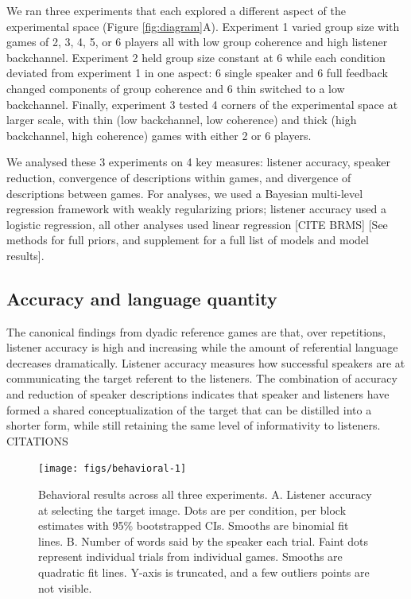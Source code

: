 \documentclass[
  english,
  a4paper,
]{article}
\begin{document}
We ran three experiments that each explored a different aspect of the experimental space (Figure \ref{fig:diagram}A). Experiment 1 varied group size with games of 2, 3, 4, 5, or 6 players all with low group coherence and high listener backchannel. Experiment 2 held group size constant at 6 while each condition deviated from experiment 1 in one aspect: 6 single speaker and 6 full feedback changed components of group coherence and 6 thin switched to a low backchannel. Finally, experiment 3 tested 4 corners of the experimental space at larger scale, with thin (low backchannel, low coherence) and thick (high backchannel, high coherence) games with either 2 or 6 players.

We analysed these 3 experiments on 4 key measures: listener accuracy, speaker reduction, convergence of descriptions within games, and divergence of descriptions between games. For analyses, we used a Bayesian multi-level regression framework with weakly regularizing priors; listener accuracy used a logistic regression, all other analyses used linear regression {[}CITE BRMS{]} {[}See methods for full priors, and supplement for a full list of models and model results{]}.

\hypertarget{accuracy-and-language-quantity}{%
\subsection{Accuracy and language quantity}\label{accuracy-and-language-quantity}}

The canonical findings from dyadic reference games are that, over repetitions, listener accuracy is high and increasing while the amount of referential language decreases dramatically. Listener accuracy measures how successful speakers are at communicating the target referent to the listeners. The combination of accuracy and reduction of speaker descriptions indicates that speaker and listeners have formed a shared conceptualization of the target that can be distilled into a shorter form, while still retaining the same level of informativity to listeners. CITATIONS

\begin{figure}[t!]

{\centering \texttt{[image: figs/behavioral-1]} 

}

\caption{Behavioral results across all three experiments. A. Listener accuracy at selecting the target image. Dots are per condition, per block estimates with 95\% bootstrapped CIs. Smooths are binomial fit lines. B. Number of words said by the speaker each trial. Faint dots represent individual trials from individual games. Smooths are quadratic fit lines. Y-axis is truncated, and a few outliers points are not visible. }\label{fig:behavioral}
\end{figure}
\end{document}

